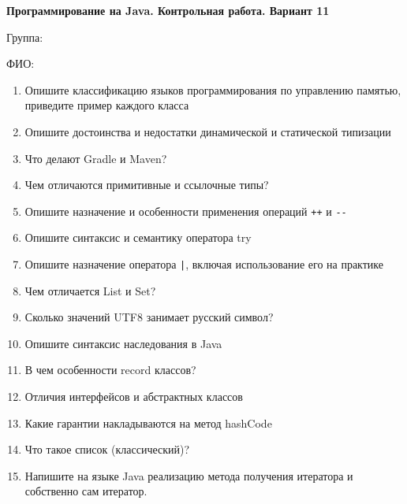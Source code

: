 \documentclass[12pt]{article}
\begin{document}
\newpage\begin{minipage}{\textwidth}
\textbf{Программирование на Java. Контрольная работа. Вариант 11}

Группа: \underline{\hspace{3cm}}

ФИО: \underline{\hspace{10cm}}

\begin{enumerate}
\item Опишите классификацию языков программирования по управлению памятью, приведите пример каждого класса
\item Опишите достоинства и недостатки динамической и статической типизации
\item Что делают Gradle и Maven?
\item Чем отличаются примитивные и ссылочные типы?
\item Опишите назначение и особенности применения операций \verb|++| и \verb|--|
\item Опишите синтаксис и семантику оператора try
\item Опишите назначение оператора \verb!|!, включая использование его на практике
\item Чем отличается List и Set?
\item Сколько значений UTF8 занимает русский символ?
\item Опишите синтаксис наследования в Java
\item В чем особенности record классов?
\item Отличия интерфейсов и абстрактных классов
\item Какие гарантии накладываются на метод hashCode
\item Что такое список (классический)?
\item Напишите на языке Java реализацию метода получения итератора и собственно сам итератор.

\end{enumerate}
\end{minipage}
\end{document}
